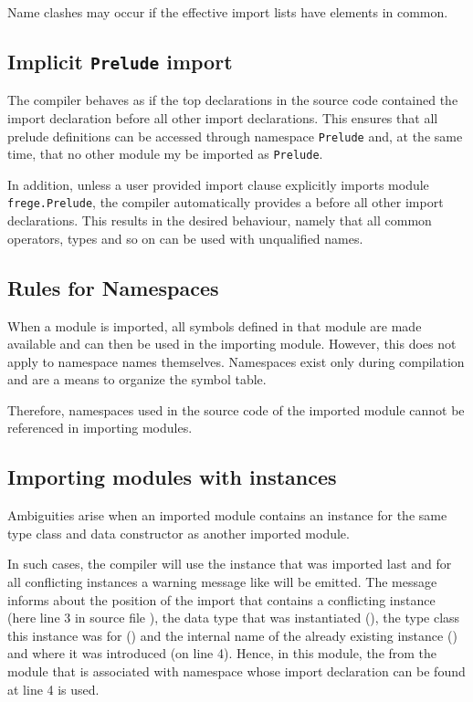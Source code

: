 Name clashes may occur if the effective import lists have elements in common. 

\subsection{Implicit \texttt{Prelude} import}
The compiler behaves as if the top declarations in
the source code contained the import declaration
before all other import declarations.
This ensures that all prelude definitions can be accessed through
namespace \texttt{Prelude} and, at the same time, that no other module my be imported as {\tt Prelude}.

In addition, unless a user provided import clause explicitly imports module \texttt{frege.Prelude}, the
compiler automatically provides a
before all other import declarations.
This results
in the desired behaviour, namely that all common operators, types and
so on can be used with unqualified names.


\subsection{Rules for Namespaces}

When a module is imported, all symbols defined in that module are made
available and can then be used in the importing module.
However, this does not apply to namespace names themselves. 
Namespaces exist only during compilation and are a means to organize the symbol table.

Therefore, namespaces used in the source code of the imported module
cannot be referenced in importing modules.

\subsection{Importing modules with instances}

Ambiguities arise when an imported module contains an instance for
the same type class and data constructor as another imported module.

In such cases, the compiler will use the instance that was imported last and for all conflicting instances a warning message like
will be emitted.
The message informs about the position of the import that contains a conflicting instance (here line 3 in source file ), the data type that was instantiated (), the type class this instance was for () and the internal name of the already existing instance () and where it was introduced (on line 4). Hence, in this module, the  from the module that is associated with namespace  whose import declaration can be found at line 4 is used.

